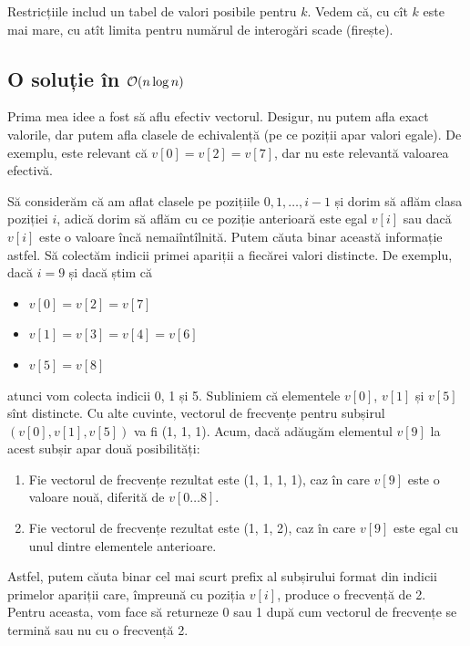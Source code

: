 \documentclass[../main.tex]{subfiles}
\begin{document}
Restricțiile includ un tabel de valori posibile pentru $k$. Vedem că, cu cît $k$ este mai mare, cu atît limita pentru numărul de interogări scade (firește).

\subsection{O soluție în \texorpdfstring{$\mathcal{O}(n \log n)$}{O(n log n)}}

Prima mea idee a fost să aflu efectiv vectorul. Desigur, nu putem afla exact valorile, dar putem afla clasele de echivalență (pe ce poziții apar valori egale). De exemplu, este relevant că $v[0] = v[2] = v[7]$, dar nu este relevantă valoarea efectivă.

Să considerăm că am aflat clasele pe pozițiile $0, 1, \dots, i-1$ și dorim să aflăm clasa poziției $i$, adică dorim să aflăm cu ce poziție anterioară este egal $v[i]$ sau dacă $v[i]$ este o valoare încă nemaiîntîlnită. Putem căuta binar această informație astfel. Să colectăm indicii primei apariții a fiecărei valori distincte. De exemplu, dacă $i = 9$ și dacă știm că

\begin{itemize}
  \item $v[0] = v[2] = v[7]$
  \item $v[1] = v[3] = v[4] = v[6]$
  \item $v[5] = v[8]$
\end{itemize}

atunci vom colecta indicii 0, 1 și 5. Subliniem că elementele $v[0]$, $v[1]$ și $v[5]$ sînt distincte. Cu alte cuvinte, vectorul de frecvențe pentru subșirul $(v[0], v[1], v[5])$ va fi (1, 1, 1). Acum, dacă adăugăm elementul $v[9]$ la acest subșir apar două posibilități:

\begin{enumerate}
  \item Fie vectorul de frecvențe rezultat este (1, 1, 1, 1), caz în care $v[9]$ este o valoare nouă, diferită de $v[0 \dots 8]$.

  \item Fie vectorul de frecvențe rezultat este (1, 1, 2), caz în care $v[9]$ este egal cu unul dintre elementele anterioare.
\end{enumerate}

Astfel, putem căuta binar cel mai scurt prefix al subșirului format din indicii primelor apariții care, împreună cu poziția $v[i]$, produce o frecvență de 2. Pentru aceasta, vom face  să returneze 0 sau 1 după cum vectorul de frecvențe se termină sau nu cu o frecvență 2.
\end{document}
